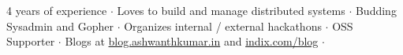 

\begin{cvparagraph}
4 years of experience ${\cdotp}$ Loves to build and manage distributed systems ${\cdotp}$
Budding Sysadmin and Gopher ${\cdotp}$ Organizes internal / external hackathons ${\cdotp}$ OSS Supporter ${\cdotp}$
Blogs at \href{http://blog.ashwanthkumar.in/}{blog.ashwanthkumar.in} and \href{http://www.indix.com/blog/author/ashwanth/}{indix.com/blog} ${\cdotp}$
\end{cvparagraph}
